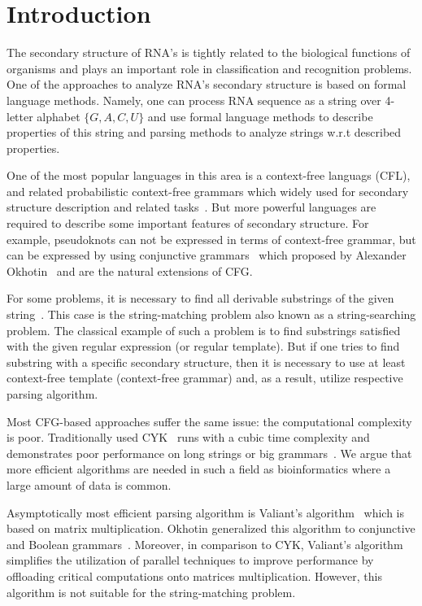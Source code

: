 \section{Introduction}

The secondary structure of RNA's is tightly related to the biological functions of organisms and plays an important role in classification and recognition problems.
One of the approaches to analyze RNA's secondary structure is based on formal language methods.
Namely, one can process RNA sequence as a string over 4-letter alphabet $\{G,A,C,U\}$ and use formal language methods to describe properties of this string and parsing methods to analyze strings w.r.t described properties. 

One of the most popular languages in this area is a context-free languags (CFL), and related probabilistic context-free grammars which widely used for secondary structure description and related tasks~\cite{knudsen1999rna,dowell2004evaluation}.
But more powerful languages are required to describe some important features of secondary structure. For example, pseudoknots can not be expressed in terms of context-free grammar, but can be expressed by using conjunctive grammars~\cite{zier2013rna} which proposed by Alexander Okhotin~\cite{10.5555/543313.543323} and are the natural extensions of CFG. 

For some problems, it is necessary to find all derivable substrings of the given string~\cite{durbin1996biological}.
This case is the string-matching problem also known as a string-searching problem.
The classical example of such a problem is to find substrings satisfied with the given regular expression (or regular template). 
But if one tries to find substring with a specific secondary structure, then it is necessary to use at least context-free template (context-free grammar) and, as a result, utilize respective parsing algorithm. 

Most CFG-based approaches suffer the same issue: the computational complexity is poor.
Traditionally used CYK~\cite{kasami1966efficient,Younger:1966:CLP:1441427.1442019} runs with a cubic time complexity and demonstrates poor performance on long strings or big grammars~\cite{liu2005parallel}.
We argue that more efficient algorithms are needed in such a field as bioinformatics where a large amount of data is common.

Asymptotically most efficient parsing algorithm is Valiant's algorithm~\cite{Valiant:1975:GCR:1739932.1740048} which is based on matrix multiplication.
Okhotin generalized this algorithm to conjunctive and Boolean grammars~\cite{Okhotin:2014:PMM:2565359.2565379}. 
Moreover, in comparison to CYK, Valiant’s algorithm simplifies the utilization of parallel techniques to improve performance by offloading critical computations onto matrices multiplication.
However, this algorithm is not suitable for the string-matching problem.

